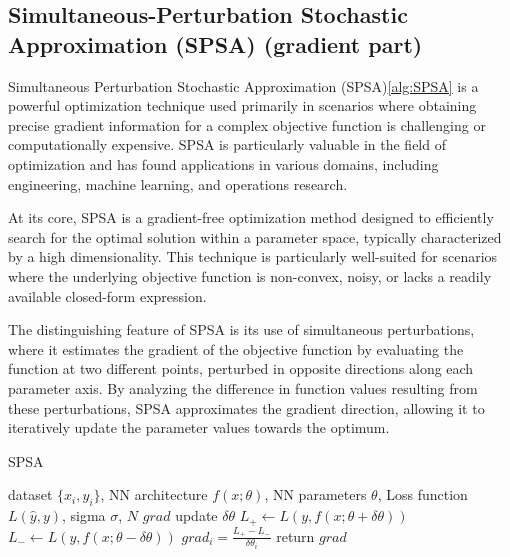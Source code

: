 \documentclass[nohyperref]{article}
\theoremstyle{plain}
\theoremstyle{definition}
\theoremstyle{remark}
\begin{document}
\subsection{Simultaneous-Perturbation Stochastic
Approximation (SPSA) (gradient part)}
Simultaneous Perturbation Stochastic Approximation (SPSA)\cref{alg:SPSA} is a powerful optimization technique used primarily in scenarios where obtaining precise gradient information for a complex objective function is challenging or computationally expensive. SPSA is particularly valuable in the field of optimization and has found applications in various domains, including engineering, machine learning, and operations research.

At its core, SPSA is a gradient-free optimization method designed to efficiently search for the optimal solution within a parameter space, typically characterized by a high dimensionality. This technique is particularly well-suited for scenarios where the underlying objective function is non-convex, noisy, or lacks a readily available closed-form expression.

The distinguishing feature of SPSA is its use of simultaneous perturbations, where it estimates the gradient of the objective function by evaluating the function at two different points, perturbed in opposite directions along each parameter axis. By analyzing the difference in function values resulting from these perturbations, SPSA approximates the gradient direction, allowing it to iteratively update the parameter values towards the optimum.

\begin{algorithm}[tb]
   \caption{SPSA}
   \label{alg:SPSA}
\begin{algorithmic}
   dataset $\{x_{i},y_{i}\}$, NN architecture $f(x;\theta)$, NN parameters $\theta$, Loss function $L(\hat{y},y)$, sigma $\sigma$, $N$
   $grad$
  \STATE update $\delta \theta$
  \STATE $L_{+} \leftarrow L(y,f(x;\theta+\delta \theta))$
  \STATE $L_{-} \leftarrow L(y,f(x;\theta-\delta \theta))$
  \STATE $grad_{i} = \frac{L_{+}-L_{-}}{\delta\theta_{i}}$
  \STATE return $grad$

\end{algorithmic}
\end{algorithm}
\end{document}
